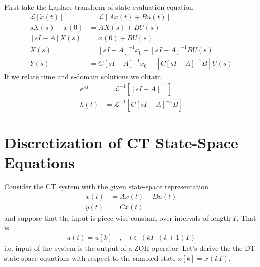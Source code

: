 \documentclass[twoside]{article}
\begin{document}
First take the Laplace transform of state evaluation equation
%
\begin{align*}
\mathcal{L} \left[ \dot{x}(t) \right] &= \mathcal{L} \left[  A x(t) + B u(t) \right]
\\
s X(s) - x(0) &= A X(s) + B U(s)
\\
[s I - A]  X(s) &= x(0) + B U(s)
\\
X(s) &= [s I - A]^{-1} x_0 + [s I - A]^{-1} B U(s)
\\
Y(s) &= C [s I - A]^{-1} x_0 + \left[ C [s I - A]^{-1} B \right] U(s)
\end{align*}
%
If we relate time and s-domain solutions we obtain
%
\begin{align*}
  e^{A t} &= \mathcal{L}^{-1} \left[ [s I - A]^{-1} \right]
\\
  h(t) &= \mathcal{L}^{-1} \left[ C [s I - A]^{-1} B  \right]
\end{align*}

\section{Discretization of CT State-Space Equations}

Consider the CT system with the given state-space representation
%
%
\begin{align*}
  \dot{x}(t) &= A x(t) + B u(t)
\\
  y(t) &= C x(t) 
\end{align*}
%
and suppose that the input is piece-wise constant over intervals of
length $T$. That is
%
\begin{align*}
  u(t) = u[k] \quad , \quad t \in ( kT \, \ (k+1) T)
\end{align*}
%
i.e. input of the system is the output of a ZOH operator. Let's derive the
the DT state-space equations with respect to the sampled-state 
$x[k] = x(kT)$.
\end{document}
